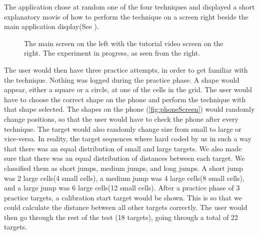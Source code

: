 The application chose at random one of the four techniques and displayed a short explanatory movie of how to perform the technique on a screen right beside the main application display(See ).

\begin{figure}[H]
	\centering
	\hspace{0.01\columnwidth}
	\caption{
		\protect{} The main screen on the left with the tutorial video screen on the right.
		\protect{} The experiment in progress, as seen from the right. 
	}
	\label{fig:setup}
\end{figure} 

The user would then have three practice attempts, in order to get familiar with the technique. 
Nothing was logged during the practice phase.
A shape would appear, either a square or a circle, at one of the cells in the grid. 
The user would have to choose the correct shape on the phone and perform the technique with that shape selected. 
The shapes on the phone (\cref{fig:phoneScreen}) would randomly change positions, so that the user would have to check the phone after every technique. 
The target would also randomly change size from small to large or vice-versa. 
In reality, the target sequences where hard coded by us in such a way that there was an equal distribution of small and large targets. 
We also made sure that there was an equal distribution of distances between each target. We classified them as short jumps, medium jumps, and long jumps. 
A short jump was 2 large cells(4 small cells), a medium jump was 4 large cells(8 small cells), and a large jump was 6 large cells(12 small cells).  
After a practice phase of 3 practice targets, a calibration start target would be shown. This is so that we could calculate the distance between all other targets correctly. 
The user would then go through the rest of the test (18 targets), going through a total of 22 targets. 

